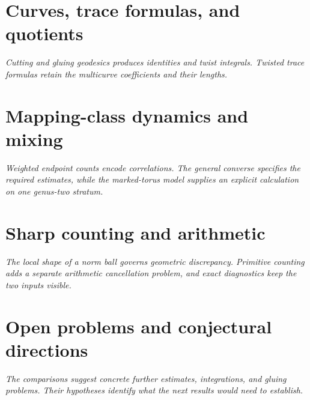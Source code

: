 \documentclass[11pt,a4paper]{article}
\newcommand{\monographpart}[2]{%
  \clearpage\part{#1}%
  \noindent\textit{#2}\par\medskip}
\numberwithin{equation}{section}
\theoremstyle{definition}
\theoremstyle{remark}
\begin{document}







\monographpart{Curves, trace formulas, and quotients}{Cutting and gluing geodesics produces identities and twist integrals. Twisted trace formulas retain the multicurve coefficients and their lengths.}







\clearpage



\monographpart{Mapping-class dynamics and mixing}{Weighted endpoint counts encode correlations. The general converse specifies the required estimates, while the marked-torus model supplies an explicit calculation on one genus-two stratum.}





\monographpart{Sharp counting and arithmetic}{The local shape of a norm ball governs geometric discrepancy. Primitive counting adds a separate arithmetic cancellation problem, and exact diagnostics keep the two inputs visible.}



\monographpart{Open problems and conjectural directions}{The comparisons suggest concrete further estimates, integrations, and gluing problems. Their hypotheses identify what the next results would need to establish.}
\end{document}
